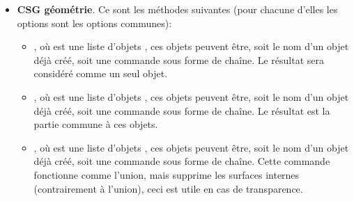 \begin{itemize}
\begin{itemize}
            \item {}, qui dessine le cylindre d'axe $(AB)$ allant de  jusqu'à  (points 3D), et de rayon . Ce sont les options communes plus l'option spécifique  qui indique si le cylindre est creux ou non.

            \item {}, qui dessine le cône d'axe $(AB)$ allant de  jusqu'à  (points 3D), et de rayon  à l'extrémité , et de rayon  à l'extrémité . Le rayon  est optionnel et vaut $0$ par défaut, dans ce cas,  est le sommet du cône. Ce sont les options communes plus l'option spécifique  qui indique si le cône est creux ou non.
            
            \item {}, qui dessine une boîte dont les faces sont parallèles à celles de la fenêtre 3D du graphique, les points 3D  et  représente une diagonale de cette boîte, plus précisément $=$M(xinf, yinf, zinf) et $=$M(xsup, ysup, zsup). Ce sont les options communes.
        \end{itemize}

    \item \textbf{CSG géométrie}. Ce sont les méthodes suivantes (pour chacune d'elles les options sont les options communes):
        \begin{itemize}
            \item {}, où  est une liste d'objets \povray, ces objets peuvent être, soit le nom d'un objet déjà créé, soit une commande \povray sous forme de chaîne. Le résultat sera considéré comme un seul objet.
            
            \item {}, où  est une liste d'objets \povray, ces objets peuvent être, soit le nom d'un objet déjà créé, soit une commande \povray sous forme de chaîne. Le résultat est la partie commune à ces objets.
            
            \item {}, où  est une liste d'objets \povray, ces objets peuvent être, soit le nom d'un objet déjà créé, soit une commande \povray sous forme de chaîne. Cette commande fonctionne comme l'union, mais supprime les surfaces internes (contrairement à l'union), ceci est utile en cas de transparence.
            

\end{itemize}
\end{itemize}
